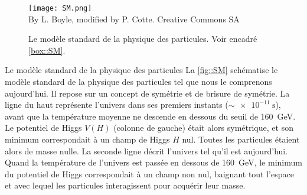       \begin{figure}[!htb!]
        \centering
        \texttt{[image: SM.png]}\\
        \tiny{By L. Boyle, modified by P. Cotte. Creative Commons SA}
        \caption[Le modèle standard de la physique des particules]{\label{fig::SM}Le modèle standard de la physique des particules. Voir encadré \ref{box::SM}.}
      \end{figure}
      \begin{figure*}[!htb!]
        \begin{activitybox}[label=box::SM]{Le modèle standard de la physique des particules}
          La \autoref{fig::SM} schématise le modèle standard de la physique des particules tel que nous le comprenons aujourd’hui. Il repose sur un concept de symétrie et de brisure de symétrie. La ligne du haut représente l'univers dans ses premiers instants ($\sim\SI{e-11}{\second}$), avant que la température moyenne ne descende en dessous du seuil de \SI{160}{\giga\electronvolt}. Le potentiel de Higgs $V(H)$ (colonne de gauche) était alors symétrique, et son minimum correspondait à un champ de Higgs $H$ nul. Toutes les particules étaient alors de masse nulle. La seconde ligne décrit l'univers tel qu'il est aujourd'hui. Quand la température de l'univers est passée en dessous de \SI{160}{\giga\electronvolt}, le minimum du potentiel de Higgs correspondait à un champ non nul, baignant tout l'espace et avec lequel les particules interagissent pour acquérir leur masse.
        

\end{activitybox}
\end{figure*}
